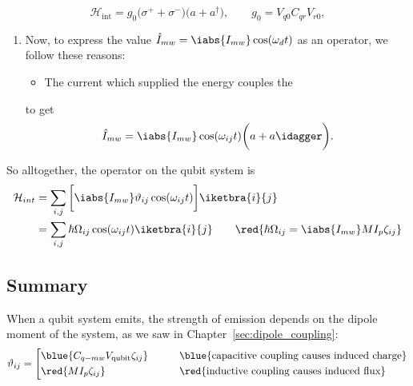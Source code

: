 \begin{framed}\noindent
  \begin{equation}
    \mathcal{H}_{\text{int}}=g_0\big(\sigma^++\sigma^-\big)\big(a+a^\dagger\big),          \qquad
    g_0=V_{q0}C_{qr}V_{r0},
  \end{equation}
\end{framed}

\begin{enumerate}


\item  Now,  to express  the  value  $  \hat{I}_{mw}  = \iabs{I_{mw}}\cos(\omega_dt)$  as  an
  operator, we follow these reasons:
  \begin{itemize}
  \item The current which supplied the energy couples the
  \end{itemize}
  \noindent to get
  \begin{equation}\label{eq:couple15}
    \hat{I}_{mw} = \iabs{I_{mw}}\cos(\omega_{ij}t)\bigg(a + a\idagger\bigg).
  \end{equation}
\end{enumerate}

\begin{framed}\noindent
  So alltogether, the operator on the qubit system is
  \begin{equation}\label{eq:couple16}
    \begin{aligned}
      \mathcal{H}_{int} & = \sum_{i,j}{\bigg[\iabs{I_{mw}}\vartheta_{ij}\cos(\omega_{ij}t)\bigg]}\iketbra{i}{j}\\
      & = \sum_{i,j} \hbar\Omega_{ij} \cos(\omega_{ij}t) \iketbra{i}{j}\qquad \red{\hbar\Omega_{ij} = \iabs{I_{mw}}MI_p\zeta_{ij}}\\
    \end{aligned}
  \end{equation}

\end{framed}



\subsection{Summary \cite{Astafiev2010}}
\begin{framed}\noindent
  \noindent When a qubit system emits, the  strength of emission depends on the dipole moment
  of the system, as we saw in Chapter~\ref{sec:dipole_coupling}:
  \begin{equation}\label{eq:couple17}
    \vartheta_{ij} = \left[\begin{aligned}
        & \blue{C_{q-mw}V_\text{qubit}\zeta_{ij}} \qquad&& \text{\blue{capacitive coupling causes induced charge}}\\
        & \red{MI_p\zeta_{ij}} \qquad&& \text{\red{inductive coupling causes induced flux}}
      \end{aligned}\right.
  \end{equation}
\end{framed}

